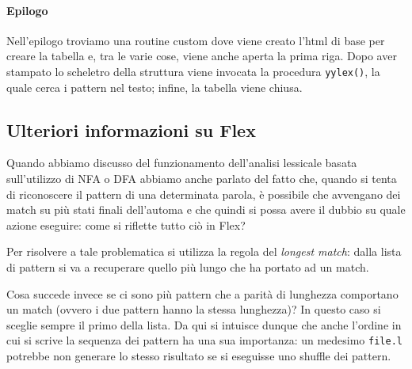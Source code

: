 \documentclass[class=book, crop=false, oneside, 12pt]{standalone}
\begin{document}
\paragraph{Epilogo}
Nell'epilogo troviamo una routine custom dove viene creato l'html di base per creare la tabella e, tra le varie cose, viene anche aperta la prima riga. Dopo aver stampato lo scheletro della struttura viene invocata la procedura \texttt{yylex()}, la quale cerca i pattern nel testo; infine, la tabella viene chiusa.

\subsection{Ulteriori informazioni su Flex}
Quando abbiamo discusso del funzionamento dell'analisi lessicale basata sull'utilizzo di NFA o DFA abbiamo anche parlato del fatto che, quando si tenta di riconoscere il pattern di una determinata parola, è possibile che avvengano dei match su più stati finali dell'automa e che quindi si possa avere il dubbio su quale azione eseguire: come si riflette tutto ciò in Flex? 

Per risolvere a tale problematica si utilizza la regola del \emph{longest match}: dalla lista di pattern si va a recuperare quello più lungo che ha portato ad un match.

Cosa succede invece se ci sono più pattern che a parità di lunghezza comportano un match (ovvero i due pattern hanno la stessa lunghezza)? In questo caso si sceglie sempre il primo della lista. Da qui si intuisce dunque che anche l'ordine in cui si scrive la sequenza dei pattern ha una sua importanza: un medesimo \texttt{file.l} potrebbe non generare lo stesso risultato se si eseguisse uno shuffle dei pattern.
\end{document}

